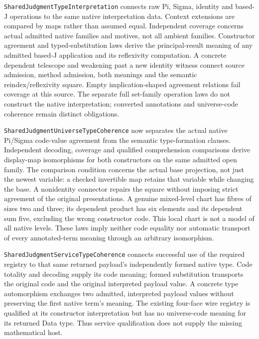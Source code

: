 \documentclass[11pt]{article}
\theoremstyle{definition}
\theoremstyle{remark}
\begin{document}
\nolinkurl{SharedJudgmentTypeInterpretation} connects raw Pi, Sigma, identity
and based-J operations to the same native interpretation data. Context
extensions are compared by maps rather than assumed equal. Independent
coverage concerns actual admitted native families and motives, not all
ambient families. Constructor agreement and typed-substitution laws derive
the principal-result meaning of any admitted based-J application and its
reflexivity computation. A concrete dependent telescope and weakening past a
new identity witness connect source admission, method admission, both meanings
and the semantic reindex/reflexivity square. Empty implication-shaped
agreement relations fail coverage at this source. The separate full set-family
operation laws do not construct the native interpretation; converted
annotations and universe-code coherence remain distinct obligations.

\nolinkurl{SharedJudgmentUniverseTypeCoherence} now separates the actual
native Pi/Sigma code-value agreement from the semantic type-formation
clauses. Independent decoding, coverage and qualified comprehension
comparisons derive display-map isomorphisms for both constructors on the
same admitted open family. The comparison condition concerns the actual
base projection, not just the newest variable: a checked invertible map
retains that variable while changing the base. A nonidentity connector
repairs the square without imposing strict agreement of the original
presentations. A genuine mixed-level chart has fibres of sizes two and
three; its dependent product has six elements and its dependent sum five,
excluding the wrong constructor code. This local chart is not a model of
all native levels. These laws imply neither code equality nor automatic
transport of every annotated-term meaning through an arbitrary isomorphism.

\nolinkurl{SharedJudgmentServiceTypeCoherence} connects successful use of
the required registry to that same returned payload's independently formed
native type. Code totality and decoding supply its code meaning; formed
substitution transports the original code and the original interpreted
payload value. A concrete type automorphism exchanges two admitted,
interpreted payload values without preserving the first native term's
meaning. The existing four-face wire registry is qualified at its constructor
interpretation but has no universe-code meaning for its returned Data type.
Thus service qualification does not supply the missing mathematical host.
\end{document}
